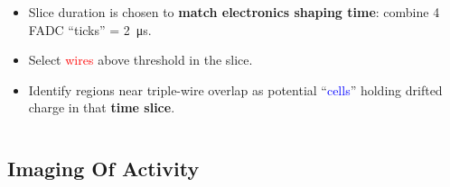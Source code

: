 \begin{frame}[fragile]
\begin{columns}
\begin{column}{0.65\textwidth}
      \begin{itemize} \scriptsize
      \item Slice duration is chosen to \textbf{match
          electronics shaping time}: combine 4 FADC ``ticks'' =
        \SI{2}{\micro\second}.
      \item Select \textcolor{red}{wires} above threshold in the slice.
      \item Identify regions near triple-wire overlap as potential ``\textcolor{blue}{cells}'' holding drifted charge in that \textbf{time slice}.
      \end{itemize}
    \end{column}
  \end{columns}

\end{frame}

\subsection{Imaging Of Activity}

